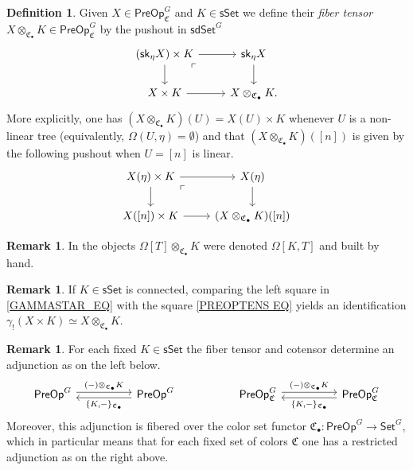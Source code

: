 \documentclass[a4paper,10pt]{article}%
\numberwithin{equation}{section}
\numberwithin{figure}{section}
\theoremstyle{definition} %
\newtheorem{definition}[equation]{Definition}%
\newtheorem{remark}[equation]{Remark}%
\newcommand{\1}{\ensuremath{\mathbbm 1}}%
\begin{document}
\begin{definition}
	Given $X \in \mathsf{PreOp}^{G}_{\mathfrak{C}}$ 
	and $K \in \mathsf{sSet}$
	we define their
	\emph{fiber tensor}
	$X \otimes_{\mathfrak{C}_{\bullet}} K
	\in \mathsf{PreOp}^G_{\mathfrak{C}}$
	by the pushout in $\mathsf{sdSet}^G$
\begin{equation}\label{PREOPTENS EQ}
\begin{tikzcd}
	\left(\mathsf{sk}_{\eta}X \right) \times K \ar{r} \ar{d} \arrow[dr, phantom, "\ulcorner", very near start]  
&
	\mathsf{sk}_{\eta}X \ar{d}
\\
	X \times K \ar{r} 
& 
	X \otimes_{\mathfrak{C}_{\bullet}} K.
\end{tikzcd}
\end{equation}
More explicitly, 
one has
$(X \otimes_{\mathfrak{C}_{\bullet}} K)(U) = X(U) \times K$
whenever $U$ is a non-linear tree 
(equivalently, $\Omega(U,\eta)=\emptyset$)
and that $(X \otimes_{\mathfrak{C}_{\bullet}} K)([n])$
is given by the following pushout when $U=[n]$ is linear.
\[
\begin{tikzcd}
	X(\eta) \times K \ar{r} \ar{d} \arrow[dr, phantom, "\ulcorner", very near start]  
&
	X(\eta) \ar{d}
\\
	X([n]) \times K \ar{r} 
& 
	(X \otimes_{\mathfrak{C}_{\bullet}} K)([n]) 
\end{tikzcd}
\]
\end{definition}


\begin{remark}\label{BYHAND1 REM}
	In \cite[\S 7.1]{CM13b}
	the objects
	$\Omega[T] \otimes_{\mathfrak{C}_{\bullet}} K$ were denoted 
	$\Omega[K,T]$
	and built by hand.
\end{remark}


\begin{remark}\label{OTIMCON REM}
	If $K \in \mathsf{sSet}$ is connected,
	comparing the left square in \eqref{GAMMASTAR_EQ}
	with the square \eqref{PREOPTENS EQ} yields an identification
	$\gamma_! \left(X \times K\right) \simeq 
	X \otimes_{\mathfrak{C}_{\bullet}} K$.
\end{remark}


\begin{remark}\label{TENSCOADJ REM}
	For each fixed $K \in \mathsf{sSet}$
	the fiber tensor and cotensor 
	determine an adjunction as on the left below.
\[
\begin{tikzcd}[column sep =50]
	\mathsf{PreOp}^G \ar[shift left=1]{r}
	{(-) \otimes_{\mathfrak{C}_{\bullet}} K}
&
	\mathsf{PreOp}^G \ar[shift left=1]{l}
	{\{K,-\}_{\mathfrak{C}_{\bullet}}}
&
	\mathsf{PreOp}^G_{\mathfrak{C}} \ar[shift left=1]{r}
	{(-) \otimes_{\mathfrak{C}_{\bullet}} K}
&
	\mathsf{PreOp}^G_{\mathfrak{C}} \ar[shift left=1]{l}
	{\{K,-\}_{\mathfrak{C}_{\bullet}}}
\end{tikzcd}
\]
Moreover, this adjunction is fibered over the color set functor
$\mathfrak{C}_{\bullet} \colon
\mathsf{PreOp}^G \to \mathsf{Set}^G$,
which in particular means that for each fixed set of colors
$\mathfrak{C}$
one has a restricted adjunction as on the right above.
\end{remark}
\end{document}
